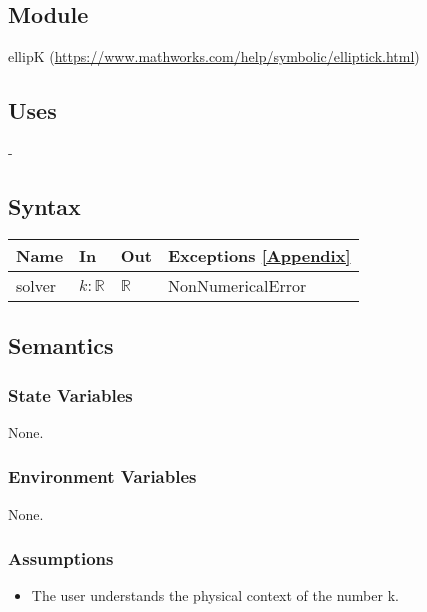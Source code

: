 \documentclass[12pt, titlepage]{article}
\begin{document}
\subsection{Module}

ellipK (\url{https://www.mathworks.com/help/symbolic/elliptick.html})

\subsection{Uses}

-

\subsection{Syntax}

\begin{center}
	\begin{tabular}{p{2cm} p{4cm} p{4cm} p{3cm}}
		\hline
		\textbf{Name} & \textbf{In} & \textbf{Out} & \textbf{Exceptions} 
		\ref{Appendix} \\
		\hline
		solver & $k : \mathbb{R}$ & $\mathbb{R}$ & 
		NonNumericalError \\ 
		\hline
	\end{tabular}
\end{center}

\subsection{Semantics}

\subsubsection{State Variables}

None.

\subsubsection{Environment Variables}

None.

\subsubsection{Assumptions}

\begin{itemize}
	\item The user understands the physical context of the number k.  
\end{itemize}
\end{document}
